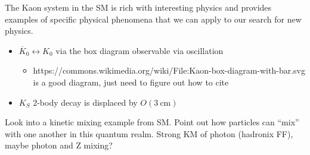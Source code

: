 \begin{todoenv}
The Kaon system in the SM is rich with interesting physics and provides examples of specific
physical phenomena that we can apply to our search for new physics.

\begin{itemize}
  \item \(\overline{K}_0 \leftrightarrow K_0\) via the box diagram observable via oscillation
  \begin{itemize}
    \item https://commons.wikimedia.org/wiki/File:Kaon-box-diagram-with-bar.svg is a good diagram, just need to figure out how to cite
  \end{itemize}
  \item \(K_S\) 2-body decay is displaced by $O(3~\text{cm})$
\end{itemize}

Look into a kinetic mixing example from SM. Point out how particles can ``mix'' with one another
in this quantum realm. Strong KM of photon (hadronix FF), maybe photon and Z mixing?
\end{todoenv}

